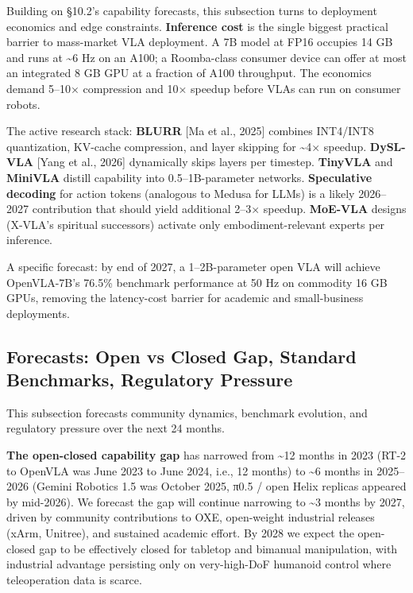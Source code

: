 Building on §10.2's capability forecasts, this subsection turns to deployment economics and edge constraints. \textbf{Inference cost} is the single biggest practical barrier to mass-market VLA deployment. A 7B model at FP16 occupies 14 GB and runs at \textasciitilde6 Hz on an A100; a Roomba-class consumer device can offer at most an integrated 8 GB GPU at a fraction of A100 throughput. The economics demand 5--10× compression and 10× speedup before VLAs can run on consumer robots.

The active research stack: \textbf{BLURR} {[}Ma et al., 2025{]} combines INT4/INT8 quantization, KV-cache compression, and layer skipping for \textasciitilde4× speedup. \textbf{DySL-VLA} {[}Yang et al., 2026{]} dynamically skips layers per timestep. \textbf{TinyVLA} and \textbf{MiniVLA} distill capability into 0.5--1B-parameter networks. \textbf{Speculative decoding} for action tokens (analogous to Medusa for LLMs) is a likely 2026--2027 contribution that should yield additional 2--3× speedup. \textbf{MoE-VLA} designs (X-VLA's spiritual successors) activate only embodiment-relevant experts per inference.

A specific forecast: by end of 2027, a 1--2B-parameter open VLA will achieve OpenVLA-7B's 76.5\% benchmark performance at 50 Hz on commodity 16 GB GPUs, removing the latency-cost barrier for academic and small-business deployments.

\subsection{Forecasts: Open vs Closed Gap, Standard Benchmarks, Regulatory Pressure}\label{forecasts-open-vs-closed-gap-standard-benchmarks-regulatory-pressure}

This subsection forecasts community dynamics, benchmark evolution, and regulatory pressure over the next 24 months.

\textbf{The open-closed capability gap} has narrowed from \textasciitilde12 months in 2023 (RT-2 to OpenVLA was June 2023 to June 2024, i.e., 12 months) to \textasciitilde6 months in 2025--2026 (Gemini Robotics 1.5 was October 2025, π0.5 / open Helix replicas appeared by mid-2026). We forecast the gap will continue narrowing to \textasciitilde3 months by 2027, driven by community contributions to OXE, open-weight industrial releases (xArm, Unitree), and sustained academic effort. By 2028 we expect the open-closed gap to be effectively closed for tabletop and bimanual manipulation, with industrial advantage persisting only on very-high-DoF humanoid control where teleoperation data is scarce.

